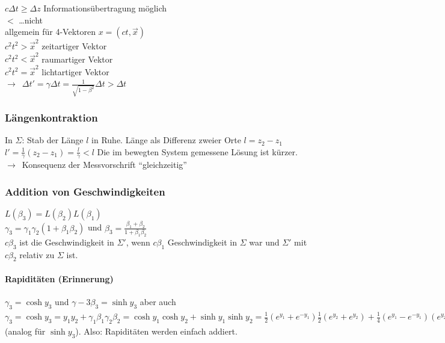 \documentclass[oneside]{book}
\theoremstyle{definition}
\newcommand{\conseq}{$\rightarrow$~}
\begin{document}
$c \Delta t \geq \Delta z$ Informationsübertragung möglich\\
$<$ \dots nicht\\

allgemein für 4-Vektoren $x = (ct, \vec{x})$\\
$c^2 t^2 > \vec{x}^2$ zeitartiger Vektor\\
$c^2 t^2 < \vec{x}^2$ raumartiger Vektor\\
$c^2 t^2 = \vec{x}^2$ lichtartiger Vektor\\

\conseq $\Delta t' = \gamma \Delta t = \frac{1}{\sqrt{1 - \beta^2}} \Delta t > \Delta t$\\


\subsubsection{Längenkontraktion}
In $\Sigma$: Stab der Länge $l$ in Ruhe. Länge als Differenz zweier Orte $l = z_2 - z_1$\\
$l' = \frac{1}{\gamma} (z_2 - z_1) = \frac{l}{\gamma} < l$
Die im bewegten System gemessene Lösung ist kürzer. \conseq Konsequenz der Messvorschrift "`gleichzeitig"'

\subsubsection{Addition von Geschwindigkeiten}
$L(\beta_3) = L(\beta_2) L(\beta_1)$\\ $\gamma_3 = \gamma_1 \gamma_2 (1 + \beta_1 \beta_2)$ und  $\beta_3 = \frac{\beta_1 + \beta_2}{1 + \beta_1 \beta_2}$\\
$c \beta_3$ ist die Geschwindigkeit in $\Sigma'$, wenn $c\beta_1$ Geschwindigkeit in $\Sigma$ war und $\Sigma'$ mit $c\beta_2$ relativ zu $\Sigma$ ist.

\paragraph{Rapiditäten (Erinnerung)} $\gamma_3 = \cosh y_3$ und $\gamma-3 \beta_3 = \sinh y_3$
aber auch $\gamma_3 = \cosh y_3 = y_1 y_2 + \gamma_1 \beta_1 \gamma_2 \beta_2 = \cosh y_1 \cosh y_2 + \sinh y_1 \sinh y_2 = \frac12 (e^{y_1} + e^{-y_1}) \frac12 (e^{y_2} + e^{y_2}) + \frac14 (e^{y_1} - e^{- y_1}) (e^{y_2} - e^{-y_2}) = \frac14 (e^{y_1} e^{y_2} + e^{y_1} e^{-y_2} + e^{-y_1} e^{y_2} + e^{-y_1} e^{-y_2} + e^{y_1} e^{y_2} - e^{y_1} e^{-y_2} - e^{-y_1} e^{y_2} - e^{-y_1} e^{-y_2}) = \frac14 (2 e^{y_1} e^{y_2} + 2 e^{-y_1} e^{-y_2}) = \frac12 (e^{y_1 + y_2} + e^{-(y_1 + y_2)}) = \cosh (y_1 + y_2) = \cosh y_3$ (analog für $\sinh y_3$). Also: Rapiditäten werden einfach addiert.
\end{document}
